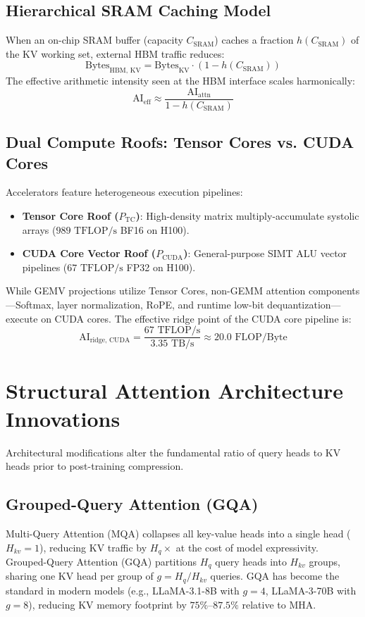 \documentclass[conference,onecolumn]{IEEEtran}
\begin{document}
\subsection{Hierarchical SRAM Caching Model}
When an on-chip SRAM buffer (capacity $C_{\text{SRAM}}$) caches a fraction $h(C_{\text{SRAM}})$ of the KV working set, external HBM traffic reduces:
\begin{equation}
\text{Bytes}_{\text{HBM, KV}} = \text{Bytes}_{\text{KV}} \cdot (1 - h(C_{\text{SRAM}}))
\end{equation}
The effective arithmetic intensity seen at the HBM interface scales harmonically:
\begin{equation}
\text{AI}_{\text{eff}} \approx \frac{\text{AI}_{\text{attn}}}{1 - h(C_{\text{SRAM}})}
\end{equation}

\subsection{Dual Compute Roofs: Tensor Cores vs. CUDA Cores}
Accelerators feature heterogeneous execution pipelines:
\begin{itemize}
    \item \textbf{Tensor Core Roof ($P_{\text{TC}}$)}: High-density matrix multiply-accumulate systolic arrays ($989\text{ TFLOP/s}$ BF16 on H100).
    \item \textbf{CUDA Core Vector Roof ($P_{\text{CUDA}}$)}: General-purpose SIMT ALU vector pipelines ($67\text{ TFLOP/s}$ FP32 on H100).
\end{itemize}
While GEMV projections utilize Tensor Cores, non-GEMM attention components---Softmax, layer normalization, RoPE, and runtime low-bit dequantization---execute on CUDA cores. The effective ridge point of the CUDA core pipeline is:
\begin{equation}
\text{AI}_{\text{ridge, CUDA}} = \frac{67\text{ TFLOP/s}}{3.35\text{ TB/s}} \approx 20.0\text{ FLOP/Byte}
\end{equation}

\section{Structural Attention Architecture Innovations}
Architectural modifications alter the fundamental ratio of query heads to KV heads prior to post-training compression.

\subsection{Grouped-Query Attention (GQA)}
Multi-Query Attention (MQA) \cite{shazeer2019fast} collapses all key-value heads into a single head ($H_{kv} = 1$), reducing KV traffic by $H_q\times$ at the cost of model expressivity. Grouped-Query Attention (GQA) \cite{ainslie2023gqa} partitions $H_q$ query heads into $H_{kv}$ groups, sharing one KV head per group of $g = H_q / H_{kv}$ queries. GQA has become the standard in modern models (e.g., LLaMA-3.1-8B with $g = 4$, LLaMA-3-70B with $g = 8$), reducing KV memory footprint by $75\%$--$87.5\%$ relative to MHA.
\end{document}

